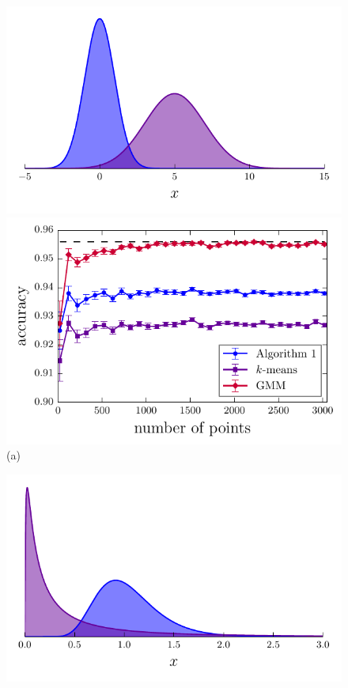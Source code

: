 \documentclass[aps,preprint,nofootinbib,floatfix]{revtex4-1}
\begin{document}
\begin{figure}
\begin{minipage}{0.49\textwidth}
\includegraphics[width=.8\textwidth]{hist_normal.pdf}\\[-.8em]
\includegraphics[width=\textwidth]{gauss1d.pdf}\\[-1em]
(a)
\end{minipage}
\begin{minipage}{0.49\textwidth}
\includegraphics[width=.8\textwidth]{hist_lognormal.pdf}\\[-.8em]

\end{minipage}
\end{figure}
\end{document}
